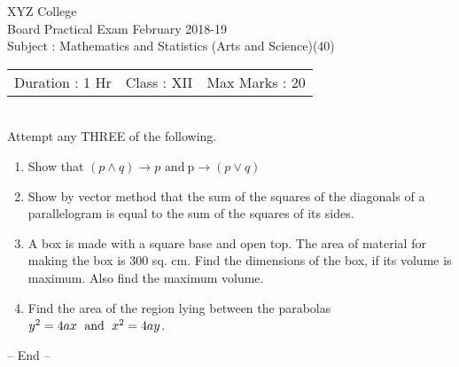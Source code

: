 \documentclass[12pt,a4paper]{article}
\begin{document}
\begin{center}
XYZ College\\
Board Practical Exam February 2018-19 \doublespacing \\
Subject : Mathematics and Statistics (Arts and Science)(40)\\
\end{center}
 
\begin{tabu} to \textwidth { X[l] X[c] X[r]}
 Duration : 1 Hr & Class : XII  & Max Marks : 20
 \end{tabu} \\

 
 
 
 Attempt any THREE of the following.  
\begin{enumerate}
\item Show that 
$(p \wedge q)\to p$ $ \text{and} \ $p$ \to(p \vee q)$  
\item Show by vector method that the sum of the squares of the diagonals of a parallelogram is equal to the sum of the squares of its sides.
\item A box is made with a square base and open top. The area of material for making the box is 300 sq. cm. Find the dimensions of the box, if its volume is maximum. Also find the maximum volume.
\item Find the area of the region lying between the parabolas$y^2 = 4ax \text{\; and \;} x^2=4ay$\;.
\end{enumerate}
\begin{center} -- End --   \end{center}
\end{document}
